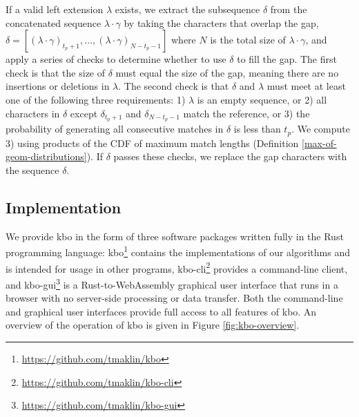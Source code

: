 \documentclass[unnumsec,webpdf,contemporary,large]{oup-authoring-template}%
\theoremstyle{thmstyleone}%
\theoremstyle{thmstyletwo}%
\theoremstyle{thmstylethree}%
\begin{document}
If a valid left extension $\lambda$ exists, we extract the subsequence $\delta$ from the concatenated sequence $\lambda \cdot \gamma$ by taking the characters that overlap the gap, $\delta = \left[\left(\lambda \cdot \gamma\right)_{t_p + 1},\dots,\left(\lambda \cdot \gamma\right)_{N - t_p - 1}\right]$ where $N$ is the total size of $\lambda \cdot \gamma$, and apply a series of checks to determine whether to use $\delta$ to fill the gap. The first check is that the size of $\delta$ must equal the size of the gap, meaning there are no insertions or deletions in $\lambda$. The second check is that $\delta$ and $\lambda$ must meet at least one of the following three requirements: 1) $\lambda$ is an empty sequence, or 2) all characters in $\delta$ except $\delta_{t_p + 1}$ and $\delta_{ N - t_p - 1}$ match the reference, or 3) the probability of generating all consecutive matches in $\delta$ is less than $t_p$. We compute 3) using products of the CDF of maximum match lengths (Definition \ref{max-of-geom-distributions}). If $\delta$ passes these checks, we replace the gap characters with the sequence $\delta$.

\subsection{Implementation}
We provide {\sf kbo} in the form of three software packages written fully in the Rust programming language: kbo\footnote{\url{https://github.com/tmaklin/kbo}} contains the implementations of our algorithms and is intended for usage in other programs, kbo-cli\footnote{\url{https://github.com/tmaklin/kbo-cli}} provides a command-line client, and kbo-gui\footnote{\url{https://github.com/tmaklin/kbo-gui}} is a Rust-to-WebAssembly graphical user interface that runs in a browser with no server-side processing or data transfer. Both the command-line and graphical user interfaces provide full access to all features of {\sf kbo}. An overview of the operation of {\sf kbo} is given in Figure \ref{fig:kbo-overview}.
\end{document}

